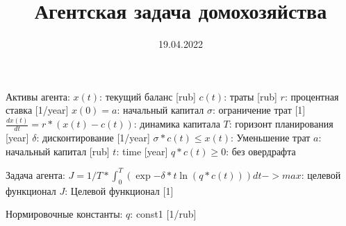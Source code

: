 \documentclass{a_model}
\title{Агентская задача домохозяйства}
\date{19.04.2022}
\begin{document}
Активы агента:
    $x(t)$: текущий баланс [rub]
    $c(t)$: траты [rub]
    $r$: процентная ставка [1/year]
    $x(0) = a$: начальный капитал
    $\sigma$: ограничение трат [1]
    $\frac{dx(t)}{dt} = r*(x(t)-c(t))$: динамика капитала
    $T$: горизонт планирования [year]
    $\delta$: дисконтирование [1/year]
    $\sigma*c(t)\leq x(t)$: Уменьшение трат
    $a$: начальный капитал [rub]
    $t$: time [year]
    $q*c(t) \geq 0$: без овердрафта

Задача агента:
    $J = 1/T * \int_0^T (\exp{-\delta*t} \ln(q*c(t)))dt -> max$: целевой функционал
    $J$: Целевой функционал [1]

Нормировочные константы:
    $q$: const1 [1/rub]
\end{document}
